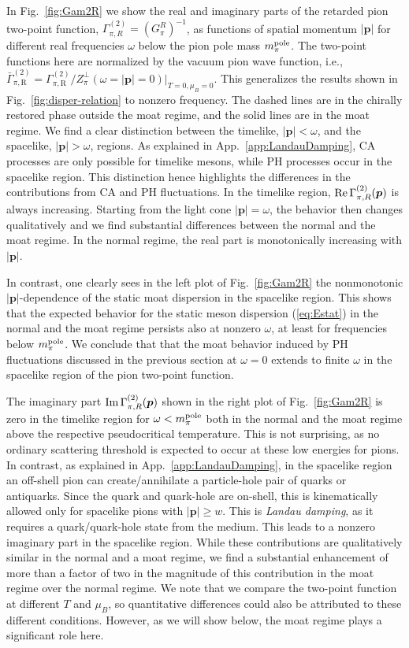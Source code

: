 \documentclass[reprint,english,superscriptaddress,preprintnumbers,amsmath,amssymb,aps,prd,nofootinbib]{revtex4-2}
\newcommand{\bs}[1]{\boldsymbol{#1}}
\def\eq#1{(\ref{#1})}
\def\Fig#1{Fig.~\ref{#1}}
\def\App#1{App.~\ref{#1}}
\begin{document}
In \Fig{fig:Gam2R} we show the real and imaginary parts of the retarded pion two-point function, $\Gamma_{\pi,R}^{(2)} = (G_\pi^R)^{-1}$, as functions of spatial momentum $|\bs{p}|$ for different real frequencies $\omega$ below the pion pole mass $m_\pi^{\rm pole}$. The two-point functions here are normalized by the vacuum pion wave function, i.e., $\bar{\Gamma}^{(2)}_{\pi, \mathrm{R}}=\Gamma^{(2)}_{\pi, \mathrm{R}}/Z^\perp_\pi(\omega=|\bs{p}|=0)|_{T=0,\mu_B=0}$.
This generalizes the results shown in \Fig{fig:disper-relation} to nonzero frequency.
The dashed lines are in the chirally restored phase outside the moat regime, and the solid lines are in the moat regime. We find a clear distinction between the timelike, $|\bs{p}| < \omega$, and the spacelike, $|\bs{p}| > \omega$, regions. As explained in \App{app:LandauDamping}, CA processes are only possible for timelike mesons, while PH processes occur in the spacelike region. This distinction hence highlights the differences in the contributions from CA and PH fluctuations. In the timelike region, ${\rm Re}\,\Gamma_{\pi,R}^{(2)}(\bs{p})$ is always increasing. Starting from the light cone $|\bs{p}| = \omega$, the behavior then changes qualitatively 
and we find substantial differences between the normal and the moat regime. In the normal regime, the real part is monotonically increasing with $|\bs{p}|$.

In contrast, one clearly sees in the left plot of \Fig{fig:Gam2R} the nonmonotonic $|\bs{p}|$-dependence of the static moat dispersion in the spacelike region.
This shows that the expected behavior for the static meson dispersion \eq{eq:Estat} in the normal and the moat regime persists also at nonzero $\omega$, at least for frequencies below $m_\pi^{\rm pole}$. We conclude that that the moat behavior induced by PH fluctuations discussed in the previous section at $\omega = 0$ extends to finite $\omega$ in the spacelike region of the pion two-point function.

The imaginary part ${\rm Im}\,\Gamma_{\pi,R}^{(2)}(\bs{p})$ shown in the right plot of \Fig{fig:Gam2R} is zero in the timelike region for $\omega < m_\pi^{\rm pole}$ both in the normal and the moat regime above the respective pseudocritical temperature. This is not surprising, as no ordinary scattering threshold is expected to occur at these low energies for pions. 
In contrast, as explained in \App{app:LandauDamping}, in the spacelike region an off-shell pion can create/annihilate a particle-hole pair of quarks or antiquarks. Since the quark and quark-hole are on-shell, this is kinematically allowed only for spacelike pions with $|\bs{p}| \geq w$. This is  \emph{Landau damping}, as it requires a quark/quark-hole state from the medium. This leads to a nonzero imaginary part in the spacelike region. While these contributions are qualitatively similar in the normal and a moat regime, we find a substantial enhancement of more than a factor of two in the magnitude of this contribution in the moat regime over the normal regime. We note that we compare the two-point function at different $T$ and $\mu_B$, so quantitative differences could also be attributed to these different conditions. However, as we will show below, the moat regime plays a significant role here. 
\end{document}
